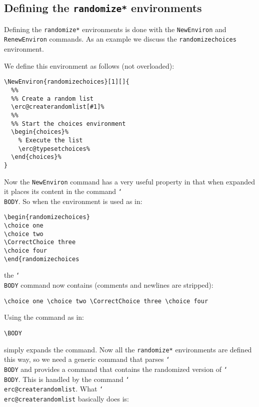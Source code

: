 \documentclass[12pt,a4paper]{exam}
\providecommand{\texorpdfstring}[2]{#1}
\newcommand{\bs}{\texorpdfstring{\char`\\}{}}
\begin{document}
\subsection{Defining the \texttt{randomize*} environments}
Defining the \texttt{randomize*} environments is done with the \texttt{NewEnviron}
and \texttt{RenewEnviron} commands. As an example we discuss the
\texttt{randomizechoices} environment.

We define this environment as follows (not overloaded):

\begin{lstlisting}
\NewEnviron{randomizechoices}[1][]{
  %%
  %% Create a random list
  \erc@createrandomlist[#1]%
  %%
  %% Start the choices environment
  \begin{choices}%
    % Execute the list
    \erc@typesetchoices%
  \end{choices}%
}
\end{lstlisting}

Now the \texttt{NewEnviron} command has a very useful property in that
when expanded it places its content in the command \texttt{\bs BODY}.
So when the environment is used as in:

\begin{lstlisting}
\begin{randomizechoices}
\choice one
\choice two
\CorrectChoice three
\choice four
\end{randomizechoices
\end{lstlisting}

the \texttt{\bs BODY} command now contains (comments and newlines are stripped):

\begin{lstlisting}
\choice one \choice two \CorrectChoice three \choice four
\end{lstlisting}

Using the command as in:

\begin{lstlisting}
\BODY
\end{lstlisting}

simply expands the command. Now all the \texttt{randomize*} environments
are defined this way, so we need a generic command that parses \texttt{\bs BODY} and
provides a command that contains the randomized version of \texttt{\bs BODY}. This is
handled by the command \texttt{\bs erc@createrandomlist}. What \texttt{\bs erc@createrandomlist}
basically does is:
\end{document}
